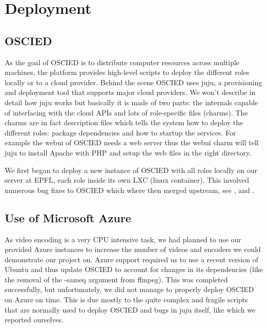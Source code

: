 \documentclass[a4paper,12pt]{article}
\begin{document}

\section{Deployment}
\subsection{OSCIED}
As the goal of OSCIED is to distribute computer resources across multiple
machines, the platform provides high-level scripts to deploy the different roles
locally or to a cloud provider.  Behind the scene OSCIED uses juju, a
provisioning and deployment tool that supports major cloud providers.  We won't
describe in detail how juju works but basically it is made of two parts: the
internals capable of interfacing with the cloud APIs and lots of
role-specific files (charms).  The charms are in fact description files which
tells the system how to deploy the different roles: package dependencies and how
to startup the services.  For example the webui of OSCIED needs a web server
thus the webui charm will tell juju to install Apache with PHP and setup the web
files in the right directory.

We first began to deploy a new instance of OSCIED with all roles locally on our
server at EPFL, each role inside its own LXC (linux container).  This involved
numerous bug fixes to OSCIED which where then merged upstream, see
\cite{ebu_merge1},
\cite{oscied_merge1}
and
\cite{pytoolbox_merge1}.

\subsection{Use of Microsoft Azure}
As video encoding is a very CPU intensive task, we had planned to use our
provided Azure instances to increase the number of videos and encoders we could
demonstrate our project on. Azure support required us to use a recent version of
Ubuntu and thus update OSCIED to account for changes in its dependencies (like
the removal of the -sameq argument from ffmpeg). This was completed
successfully, but unfortunately, we did not manage to properly deploy OSCIED on
Azure on time. This is due mostly to the quite complex and fragile scripts that
are normally used to deploy OSCIED and bugs in juju itself, like
\cite{juju_bug1} which we reported ourselves.
\end{document}
